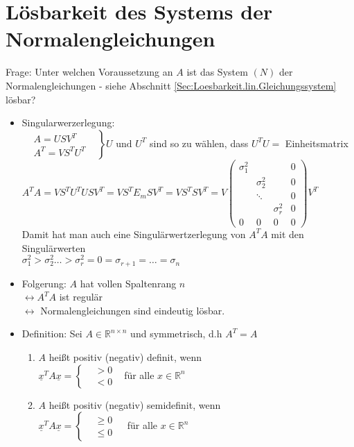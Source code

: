 \documentclass[ngerman]{tudscrreprt}
\begin{document}
\section{Lösbarkeit des Systems der Normalengleichungen}
Frage: Unter welchen Voraussetzung an $A$ ist das System $(N)$ der Normalengleichungen - siehe Abschnitt \ref{Sec:Loesbarkeit.lin.Gleichungssystem} lösbar?\\
\begin{itemize}
\item Singularwerzerlegung:\\
$\left.
\begin{matrix}
&A= U S V^T&\\
&A^T= V S^T U^T&
\end{matrix}
\right\} U \text{ und } U^T $ sind so zu wählen, dass $U^T U = $ Einheitsmatrix\\

$A^T A = V S^T U^T U S V^T = V S^T E_m S V^T = V S^T S V^T = V 
\begin{pmatrix}
\sigma_1^2 &           &  			&0 \\
           &\sigma_2^2 &  			&0 \\
           &   \ddots  &  			&0 \\
           &           & \sigma_r^2 &0 \\
 0         &   0       &  	0		&0 
\end{pmatrix} V^T 
$ \\
Damit hat man auch eine Singulärwertzerlegung von $A^T A$ mit den Singulärwerten
\\$ \sigma_1^2 > \sigma_2^2 \dots > \sigma_r^2 = 0 = \sigma_{r+1} = \dots = \sigma_n$\\

\item Folgerung: $A$ hat vollen Spaltenrang $n$
\\$\leftrightarrow A^T A $ ist regulär\\
$\leftrightarrow $ Normalengleichungen sind eindeutig lösbar.

\item Definition: Sei $A \in \mathbb{R}^{n\times n}$ und symmetrisch, d.h $A^T = A$\\
\begin{enumerate}
\item $A$ heißt positiv (negativ) definit, wenn \\
	$\underline{x}^T A \underline{x} = \left\{ \begin{matrix} &>0& \\ & <0 & \end{matrix}\right. $für alle $x \in \mathbb{R}^n $ 
\item $A$ heißt positiv (negativ) semidefinit, wenn \\
	$\underline{x}^T A\underline{x} = \left\{ \begin{matrix} &\geq 0& \\ &\leq 0& \end{matrix} \right. $ für alle $x\in \mathbb{R}^n$


\end{enumerate}
\end{itemize}
\end{document}
